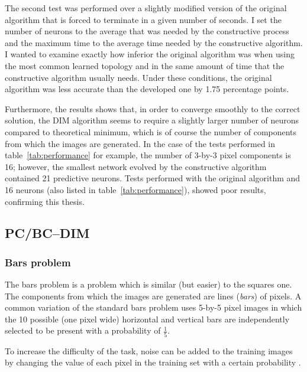 \documentclass[11pt,a4paper]{report}
\begin{document}
				The second test was performed over a slightly modified version of the original algorithm that is forced to terminate in a given number of seconds. I set the number of neurons to the average that was needed by the constructive process and the maximum time to the average time needed by the constructive algorithm. I wanted to examine exactly how inferior the original algorithm was when using the most common learned topology and in the same amount of time that the constructive algorithm usually needs. Under these conditions, the original algorithm was less accurate than the developed one by 1.75 percentage points.
				
				Furthermore, the results shows that, in order to converge smoothly to the correct solution, the DIM algorithm seems to require a slightly larger number of neurons compared to theoretical minimum, which is of course the number of components from which the images are generated. In the case of the tests performed in table~\ref{tab:performance} for example, the number of 3-by-3 pixel components is 16; however, the smallest network evolved by the constructive algorithm contained 21 predictive neurons. Tests performed with the original algorithm and 16 neurons (also listed in table~\ref{tab:performance}), showed poor results, confirming this thesis.
				
			\subsection{PC/BC--DIM}
				\subsubsection{Bars problem}
					The bars problem is a problem which is similar (but easier) to the squares one. The components from which the images are generated are lines (\emph{bars}) of pixels. A common variation of the standard bars problem uses 5-by-5 pixel images in which the 10 possible (one pixel wide) horizontal and vertical bars are independently selected to be present with a probability of $\frac{1}{5}$.
					
					To increase the difficulty of the task, noise can be added to the training images by changing the value of each pixel in the training set with a certain probability \cite{spratling2012unsupervised}.
					
\end{document}
